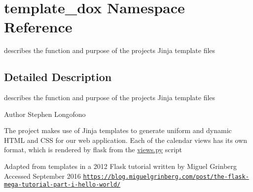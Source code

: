 \hypertarget{namespacetemplate__dox}{}\section{template\+\_\+dox Namespace Reference}
\label{namespacetemplate__dox}


describes the function and purpose of the project\textquotesingle{}s Jinja template files  




\subsection{Detailed Description}
describes the function and purpose of the project\textquotesingle{}s Jinja template files 

\begin{DoxyAuthor}{Author}
Stephen Longofono
\end{DoxyAuthor}
The project makes use of Jinja templates to generate uniform and dynamic H\+T\+ML and C\+SS for our web application. Each of the calendar views has its own format, which is rendered by flask from the \hyperlink{views_8py}{views.\+py} script

Adapted from templates in a 2012 Flask tutorial written by Miguel Grinberg Accessed September 2016 \href{https://blog.miguelgrinberg.com/post/the-flask-mega-tutorial-part-i-hello-world/}{\tt https\+://blog.\+miguelgrinberg.\+com/post/the-\/flask-\/mega-\/tutorial-\/part-\/i-\/hello-\/world/} 